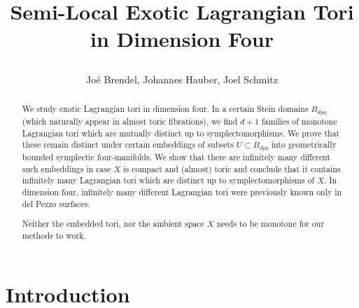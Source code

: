 \documentclass[12pt,a4paper,abstract=true,draft]{scrartcl}
\begin{document}
\title{Semi-Local Exotic Lagrangian Tori in Dimension Four\\
\bigskip
{}\vspace{-0.5cm}}
\author{Joé Brendel, Johannes Hauber, Joel Schmitz}

\maketitle

\begin{abstract}
    We study exotic Lagrangian tori in dimension four.
In a certain Stein domains $B_{dpq}$ (which naturally appear in almost toric fibrations), we find $d+1$ families of monotone Lagrangian tori which are mutually distinct up to symplectomorphisms.
We prove that these remain distinct under certain embeddings of subsets $U \subset B_{dpq}$ into geometrically bounded symplectic four-manifolds.
We show that there are infinitely many different such embeddings in case $X$ is compact and (almost) toric and conclude that it contains infinitely many Lagrangian tori which are distinct up to symplectomorphisms of $X$.
In dimension four, infinitely many different Lagrangian tori were previously known
only in del Pezzo surfaces.

    Neither the embedded tori, nor the ambient space $X$ needs to be monotone for our methods to work. 
\end{abstract}

\section{Introduction}
\end{document}
